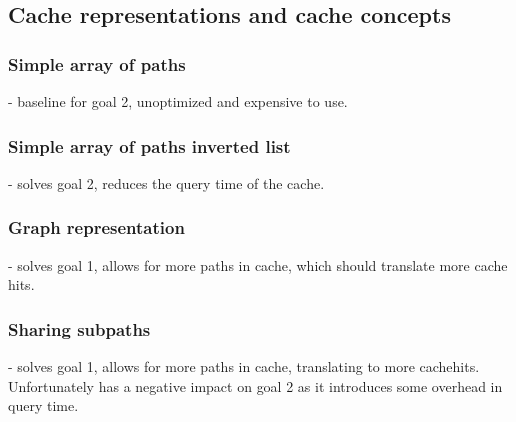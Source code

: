 \subsection{Cache representations and cache concepts} 

\subsubsection{Simple array of paths} - baseline for goal 2, unoptimized and expensive to use.

\subsubsection{Simple array of paths inverted list} - solves goal 2, reduces the query time of the cache.

\subsubsection{Graph representation} - solves goal 1, allows for more paths in cache, which should translate more cache hits.

\subsubsection{Sharing subpaths} - solves goal 1, allows for more paths in cache, translating to more cachehits. Unfortunately has a negative impact on goal 2 as it introduces some overhead in query time.


